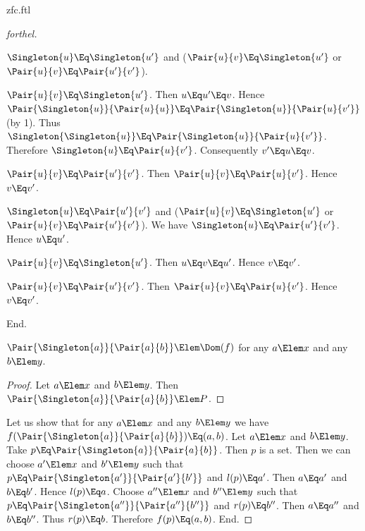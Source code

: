 \documentclass{stex}
\begin{document}
\begin{smodule}{zfc.ftl}
\begin{proof}[forthel]
\begin{case}{$\Singleton{u} \Eq \Singleton{u'}$ and ($\Pair{u}{v} \Eq \Singleton{u'}$ or $\Pair{u}{v} \Eq \Pair{u'}{v'}$).}
      \begin{case}{$\Pair{u}{v} \Eq \Singleton{u'}$.}
        Then $u \Eq u'\Eq v$.
        Hence $\Pair{\Singleton{u}}{\Pair{u}{u}} \Eq \Pair{\Singleton{u}}{\Pair{u}{v'}}$ (by 1).
        Thus $\Singleton{\Singleton{u}} \Eq \Pair{\Singleton{u}}{\Pair{u}{v'}}$.
        Therefore $\Singleton{u} \Eq \Pair{u}{v'}$.
        Consequently $v' \Eq u \Eq v$.
      \end{case}

      \begin{case}{$\Pair{u}{v} \Eq \Pair{u'}{v'}$.}
        Then $\Pair{u}{v} \Eq \Pair{u}{v'}$.
        Hence $v \Eq v'$.
      \end{case}
    \end{case}

    \begin{case}{$\Singleton{u} \Eq \Pair{u'}{v'}$ and ($\Pair{u}{v} \Eq \Singleton{u'}$ or $\Pair{u}{v} \Eq \Pair{u'}{v'}$).}
      We have $\Singleton{u} \Eq \Pair{u'}{v'}$.
      Hence $u \Eq u'$.

      \begin{case}{$\Pair{u}{v} \Eq \Singleton{u'}$.}
        Then $u \Eq v \Eq u'$.
        Hence $v \Eq v'$.
      \end{case}

      \begin{case}{$\Pair{u}{v} \Eq \Pair{u'}{v'}$.}
        Then $\Pair{u}{v} \Eq \Pair{u}{v'}$.
        Hence $v \Eq v'$.
      \end{case}
    \end{case}
  End.

  $\Pair{\Singleton{a}}{\Pair{a}{b}} \Elem \Dom(f)$ for any $a \Elem x$ and any $b \Elem y$. %
  \begin{proof}
    Let $a \Elem x$ and $b \Elem y$.
    Then $\Pair{\Singleton{a}}{\Pair{a}{b}} \Elem P$.
  \end{proof}

  Let us show that for any $a \Elem x$ and any $b \Elem y$ we have $f(\Pair{\Singleton{a}}{\Pair{a}{b}}) \Eq (a,b)$.
    Let $a \Elem x$ and $b \Elem y$.
    Take $p \Eq \Pair{\Singleton{a}}{\Pair{a}{b}}$.
    Then $p$ is a set.
    Then we can choose $a' \Elem x$ and $b' \Elem y$ such that $p \Eq \Pair{\Singleton{a'}}{\Pair{a'}{b'}}$ and $l(p) \Eq a'$.
    Then $a \Eq a'$ and $b \Eq b'$.
    Hence $l(p) \Eq a$.
    Choose $a'' \Elem x$ and $b'' \Elem y$ such that $p \Eq \Pair{\Singleton{a''}}{\Pair{a''}{b''}}$ and $r(p) \Eq b''$.
    Then $a \Eq a''$ and $b \Eq b''$.
    Thus $r(p) \Eq b$.
    Therefore $f(p) \Eq (a,b)$.
  End.


\end{proof}
\end{smodule}
\end{document}
